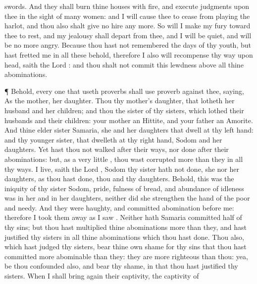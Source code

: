 {swords.
And they shall
burn thine
houses with
fire, and
execute
judgments upon thee in the
sight of
many
women: and I will cause thee to
cease from playing the
harlot, and thou also shalt
give no
hire any more.
So will I make my
fury toward thee to
rest, and my
jealousy shall
depart from thee, and I will be
quiet, and will be no more
angry.
Because thou hast not
remembered the
days of thy
youth, but hast
fretted me in all these
{}
behold, therefore I also will
recompense thy
way upon
{}
head,
saith the
Lord
{}: and thou shalt not
commit this
lewdness above all thine
abominations.
\par }{\PP {}¶ Behold, every one that useth
proverbs shall use
{}
proverb against thee,
saying, As
{} the
mother,
{} her
daughter.
Thou
{} thy
mother’s
daughter, that
lotheth her
husband and her
children; and thou
{} the
sister of thy
sisters, which
lothed their
husbands and their
children: your
mother
{} an
Hittite, and your
father an
Amorite.
And thine
elder
sister
{}
Samaria, she and her
daughters that
dwell at thy left
hand: and thy
younger
sister, that
dwelleth at thy right
hand,
{}
Sodom and her
daughters.
Yet hast thou not
walked after their
ways, nor
done after their
abominations: but, as
{} a
very
little
{}, thou wast
corrupted more than
they in all thy
ways.
 I
live,
saith the
Lord
{},
Sodom thy
sister hath not
done, she nor her
daughters, as thou hast
done, thou and thy
daughters.
Behold, this was the
iniquity of thy
sister
Sodom,
pride,
fulness of
bread, and
abundance of
idleness was in her and in her
daughters, neither did she
strengthen the
hand of the
poor and
needy.
And they were
haughty, and
committed
abomination
before me: therefore I took them
away as I
saw
{}.
Neither hath
Samaria
committed
half of thy
sins; but thou hast
multiplied thine
abominations more than
they, and hast
justified thy
sisters in all thine
abominations which thou hast
done.
Thou also, which hast
judged thy
sisters,
bear thine own
shame for thy
sins that thou hast committed more
abominable than
they: they are more
righteous than thou: yea, be thou
confounded also, and
bear thy
shame, in that thou hast
justified thy
sisters.
When I shall bring
again their
captivity, the
captivity of
}
